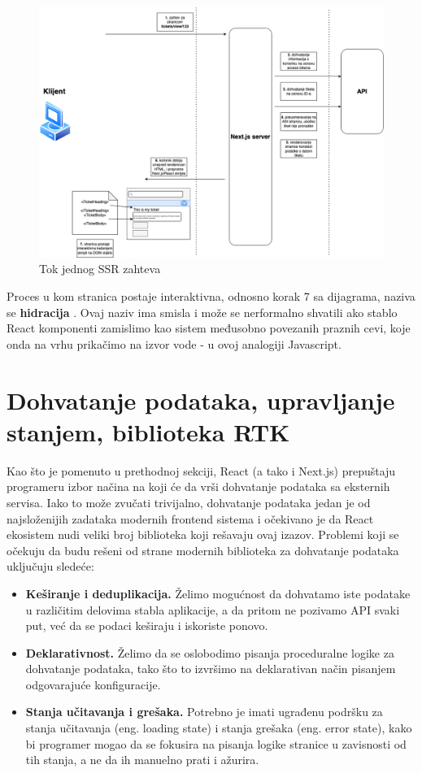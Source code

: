 \documentclass[12pt,oneside]{memoir}
\begin{document}
\begin{figure}[h]
  \centering
  \includegraphics[width=1\textwidth]{docs/images/ch_4/nextjs_flow.png} 
  \caption{Tok jednog SSR zahteva}
  \label{fig:ssrdiagram}
\end{figure}

Proces u kom stranica postaje interaktivna, odnosno korak 7 sa dijagrama, naziva se \textbf{hidracija} \cite{reactdocscomponents}. Ovaj naziv ima smisla i može se nerformalno shvatili ako stablo React komponenti zamislimo kao sistem međusobno povezanih praznih cevi, koje onda na vrhu prikačimo na izvor vode - u ovoj analogiji Javascript.

\newpage
\label{sec:datafetchingandconfiguration}
\section{Dohvatanje podataka, upravljanje stanjem, biblioteka RTK}

Kao što je pomenuto u prethodnoj sekciji, React (a tako i Next.js) prepuštaju programeru izbor načina na koji će da vrši dohvatanje podataka sa eksternih servisa. Iako to može zvučati trivijalno, dohvatanje podataka jedan je od najsloženijih zadataka modernih frontend sistema i očekivano je da React ekosistem nudi veliki broj biblioteka koji rešavaju ovaj izazov. Problemi koji se očekuju da budu rešeni od strane modernih biblioteka za dohvatanje podataka uključuju sledeće:

\begin{itemize}
    \item \textbf{Keširanje i deduplikacija.} Želimo mogućnost da dohvatamo iste podatake u različitim delovima stabla aplikacije, a da pritom ne pozivamo API svaki put, već da se podaci keširaju i iskoriste ponovo.
    \item \textbf{Deklarativnost.} Želimo da se oslobodimo pisanja proceduralne logike za dohvatanje podataka, tako što to izvršimo na deklarativan način pisanjem odgovarajuće konfiguracije.
    \item \textbf{Stanja učitavanja i grešaka.} Potrebno je imati ugrađenu podršku za stanja učitavanja (eng. loading state) i stanja grešaka (eng. error state), kako bi programer mogao da se fokusira na pisanja logike stranice u zavisnosti od tih stanja, a ne da ih manuelno prati i ažurira.
\end{itemize}
\end{document}
